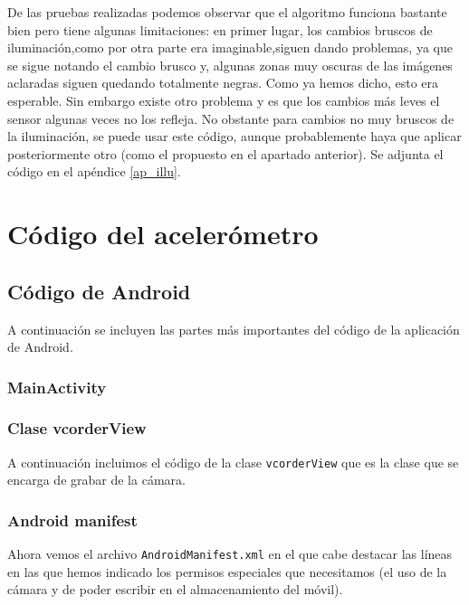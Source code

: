 \documentclass[a4paper,openright, 12pt]{book}
\begin{document}
De las pruebas realizadas podemos observar que el algoritmo funciona bastante bien pero tiene algunas limitaciones: en primer lugar, los cambios bruscos de iluminación,como por otra parte era imaginable,siguen dando problemas, ya que se sigue notando el cambio brusco y, algunas zonas muy oscuras de las imágenes aclaradas siguen quedando totalmente negras. Como ya hemos dicho, esto era esperable. Sin embargo existe otro problema y es que los cambios más leves el sensor algunas veces no los refleja. 
No obstante para cambios no muy bruscos de la iluminación, se puede usar este código, aunque probablemente haya que aplicar posteriormente otro (como el propuesto en el apartado anterior).
Se adjunta el código en el apéndice \ref{ap_illu}.
\appendix
\chapter{Código del acelerómetro} 
\section{Código de Android} \label{android_ap_acc}
A continuación se incluyen las partes más importantes del código de la aplicación de Android.

\subsection{MainActivity}


\newpage

\subsection{Clase vcorderView}
A continuación incluimos el código de la clase \lstinline|vcorderView| que es la clase que se encarga de grabar de la cámara.

\newpage
\subsection{Android manifest}
Ahora vemos el archivo \lstinline|AndroidManifest.xml| en el que cabe destacar las líneas en las que hemos indicado los permisos especiales que necesitamos (el uso de la cámara y de poder escribir en el almacenamiento del móvil).

\end{document}
